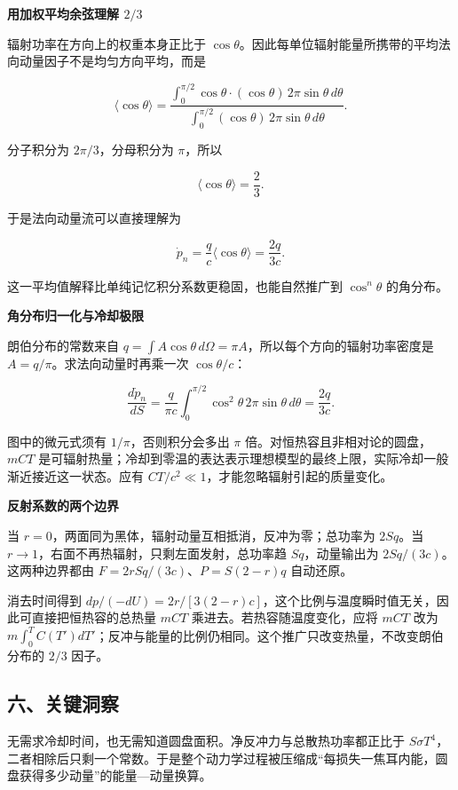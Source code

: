\documentclass[12pt,a4paper,UTF8]{ctexart}
\begin{document}
\textbf{用加权平均余弦理解 \(2/3\)}

辐射功率在方向上的权重本身正比于
\(\cos\theta\)。因此每单位辐射能量所携带的平均法向动量因子不是均匀方向平均，而是

\[
\langle\cos\theta\rangle
=\frac{\int_0^{\pi/2}\cos\theta\cdot
(\cos\theta)\,2\pi\sin\theta\,d\theta}
{\int_0^{\pi/2}(\cos\theta)\,2\pi\sin\theta\,d\theta}.
\]

分子积分为 \(2\pi/3\)，分母积分为 \(\pi\)，所以

\[
\langle\cos\theta\rangle=\frac23.
\]

于是法向动量流可以直接理解为

\[
\dot p_n=\frac qc\langle\cos\theta\rangle
=\frac{2q}{3c}.
\]

这一平均值解释比单纯记忆积分系数更稳固，也能自然推广到 \(\cos^n\theta\)
的角分布。

\textbf{角分布归一化与冷却极限}

朗伯分布的常数来自
\(q=\int A\cos\theta\,d\Omega=\pi A\)，所以每个方向的辐射功率密度是
\(A=q/\pi\)。求法向动量时再乘一次 \(\cos\theta/c\)：

\[\frac{d\dot p_n}{dS}=\frac{q}{\pi c}\int_0^{\pi/2}\cos^2\theta\,2\pi\sin\theta\,d\theta=\frac{2q}{3c}.\]

图中的微元式须有 \(1/\pi\)，否则积分会多出 \(\pi\)
倍。对恒热容且非相对论的圆盘，\(mCT\)
是可辐射热量；冷却到零温的表达表示理想模型的最终上限，实际冷却一般渐近接近这一状态。应有
\(CT/c^2\ll1\)，才能忽略辐射引起的质量变化。

\textbf{反射系数的两个边界}

当 \(r=0\)，两面同为黑体，辐射动量互相抵消，反冲为零；总功率为
\(2Sq\)。当 \(r\to1\)，右面不再热辐射，只剩左面发射，总功率趋
\(Sq\)，动量输出为 \(2Sq/(3c)\)。这两种边界都由
\(F=2rSq/(3c)\)、\(P=S(2-r)q\) 自动还原。

消去时间得到
\(dp/(-dU)=2r/[3(2-r)c]\)，这个比例与温度瞬时值无关，因此可直接把恒热容的总热量
\(mCT\) 乘进去。若热容随温度变化，应将 \(mCT\) 改为
\(m\int_0^T C(T')dT'\)；反冲与能量的比例仍相同。这个推广只改变热量，不改变朗伯分布的
\(2/3\) 因子。

\subsection{六、关键洞察}\label{ux516dux5173ux952eux6d1eux5bdf-7}

无需求冷却时间，也无需知道圆盘面积。净反冲力与总散热功率都正比于
\(S\sigma T^4\)，二者相除后只剩一个常数。于是整个动力学过程被压缩成``每损失一焦耳内能，圆盘获得多少动量''的能量---动量换算。
\end{document}
